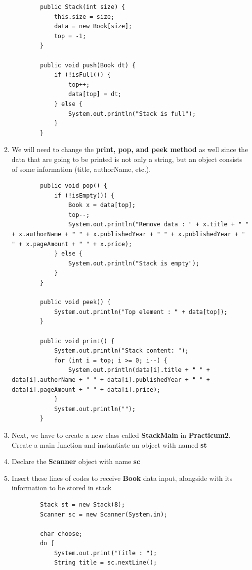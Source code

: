 \documentclass[12pt,titlepage]{article}
\begin{document}
\begin{enumerate}
\begin{verbatim}
        public Stack(int size) {
            this.size = size;
            data = new Book[size];
            top = -1;
        }

        public void push(Book dt) {
            if (!isFull()) {
                top++;
                data[top] = dt;
            } else {
                System.out.println("Stack is full");
            }
        }
    \end{verbatim}
    \item We will need to change the \textbf{print, pop, and peek method} as well since the data that are going to be printed is not only a string, but an object consists of some information (title, authorName, etc.).
    \begin{verbatim}
        public void pop() {
            if (!isEmpty()) {
                Book x = data[top];
                top--;
                System.out.println("Remove data : " + x.title + " " + x.authorName + " " + x.publishedYear + " " + x.publishedYear + " " + x.pageAmount + " " + x.price);
            } else {
                System.out.println("Stack is empty");
            }
        }

        public void peek() {
            System.out.println("Top element : " + data[top]);
        }

        public void print() {
            System.out.println("Stack content: ");
            for (int i = top; i >= 0; i--) {
                System.out.println(data[i].title + " " + data[i].authorName + " " + data[i].publishedYear + " " + data[i].pageAmount + " " + data[i].price);
            }
            System.out.println("");
        }
    \end{verbatim}
    \item Next, we have to create a new class called \textbf{StackMain} in \textbf{Practicum2}. Create a main function and instantiate an object with named \textbf{st}
    \item Declare the \textbf{Scanner} object with name \textbf{sc}
    \item Insert these lines of codes to receive \textbf{Book} data input, alongside with its information to be stored in stack
    \begin{verbatim}
        Stack st = new Stack(8);
        Scanner sc = new Scanner(System.in);

        char choose;
        do {
            System.out.print("Title : ");
            String title = sc.nextLine();
            

\end{verbatim}
\end{enumerate}
\end{document}
